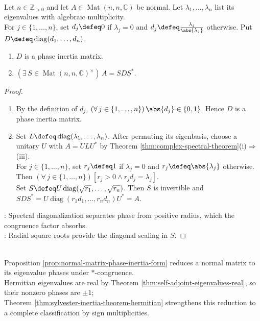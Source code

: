 \begin{proposition} \label{prop:normal-matrix-phase-inertia-form} \\
Let $n\in\mathbb{Z}_{>0}$ and let $A\in\operatorname{Mat}(n,n,\mathbb{C})$ be normal. Let $\lambda_1,\ldots,\lambda_n$ list its eigenvalues with algebraic multiplicity.\\
For $j\in\{1,\ldots,n\}$, set $d_j\defeq 0$ if $\lambda_j=0$ and $d_j\defeq\frac{\lambda_j}{\abs{\lambda_j}}$ otherwise. Put $D\defeq\operatorname{diag}(d_1,\ldots,d_n)$.
\begin{enumerate}[label=(\roman*)]
\setlength{\itemsep}{0pt}
\item $D$ is a phase inertia matrix.
\item $(\exists\,S\in\operatorname{Mat}(n,n,\mathbb{C})^\times)\,A=SDS^*$.
\end{enumerate}
\begin{proof}
\begin{enumerate}[label=(\roman*)]
\setlength{\itemsep}{0pt}
\item By the definition of $d_j$, $(\forall\,j\in\{1,\ldots,n\})\,\abs{d_j}\in\{0,1\}$. Hence $D$ is a phase inertia matrix.
\item Set $L\defeq\operatorname{diag}(\lambda_1,\ldots,\lambda_n)$. After permuting its eigenbasis, choose a unitary $U$ with $A=ULU^*$ by Theorem \ref{thm:complex-spectral-theorem}(i)$\Rightarrow$(iii).\\
For $j\in\{1,\ldots,n\}$, set $r_j\defeq1$ if $\lambda_j=0$ and $r_j\defeq\abs{\lambda_j}$ otherwise. Then $(\forall\,j\in\{1,\ldots,n\})[r_j>0\land r_jd_j=\lambda_j]$.\\
Set $S\defeq U\operatorname{diag}(\sqrt{r_1},\ldots,\sqrt{r_n})$. Then $S$ is invertible and $SDS^*=U\operatorname{diag}(r_1d_1,\ldots,r_nd_n)U^*=A$.
\end{enumerate}
: Spectral diagonalization separates phase from positive radius, which the congruence factor absorbs.\\
: Radial square roots provide the diagonal scaling in $S$.
\end{proof}
\end{proposition}

\begin{perspective} \label{per:hermitian-inertia-as-real-phase-inertia} \\
Proposition \ref{prop:normal-matrix-phase-inertia-form} reduces a normal matrix to its eigenvalue phases under $*$-congruence.\\
Hermitian eigenvalues are real by Theorem \ref{thm:self-adjoint-eigenvalues-real}, so their nonzero phases are $\pm1$;\\
Theorem \ref{thm:sylvester-inertia-theorem-hermitian} strengthens this reduction to a complete classification by sign multiplicities.
\end{perspective}
